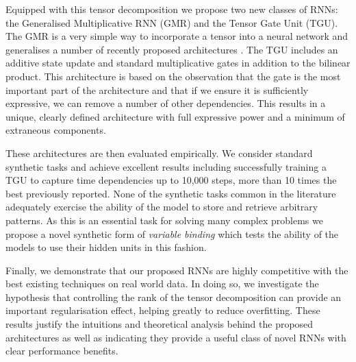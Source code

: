 Equipped with this tensor decomposition we propose two new classes of RNNs: the Generalised
Multiplicative RNN (GMR) and the Tensor Gate Unit (TGU).
The GMR is a very simple way to incorporate a tensor into a neural network and generalises a number of
recently proposed architectures \autocite{Martens2011a, Wu2016}. The TGU includes an
additive state update and standard multiplicative gates in addition to the bilinear product. 
This architecture is based on the observation that the gate is the most important part of the architecture
and that if we ensure it is sufficiently expressive, we can remove a number of other dependencies. This
results in a unique, clearly defined architecture with full expressive power and a minimum of extraneous
components.

These architectures are then evaluated empirically. We consider standard synthetic tasks and achieve
excellent results including successfully training a TGU to capture time dependencies up to 10,000 steps,
more than 10 times the best previously reported. None of the synthetic tasks common in the
literature adequately exercise the ability of the model to store and retrieve arbitrary patterns.
As this is an essential task for solving many complex problems we propose a novel synthetic
form of \emph{variable binding} which tests the ability of the models to use their hidden units in this
fashion.

Finally, we demonstrate that our proposed RNNs are highly competitive with the best existing techniques
on real world data. In doing so, we investigate the hypothesis that controlling the rank of the tensor
decomposition can provide an important regularisation effect, helping greatly to reduce overfitting.
These results justify the intuitions and theoretical analysis behind the proposed architectures
as well as indicating they provide a useful class of novel RNNs with clear performance benefits.